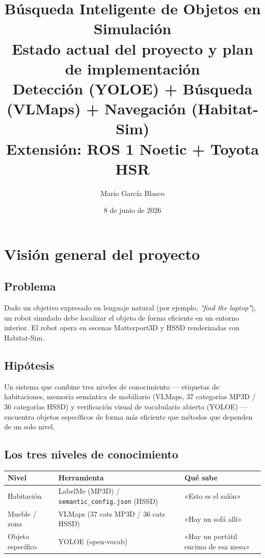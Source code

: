 \documentclass[11pt,a4paper]{article}
\title{\textbf{Búsqueda Inteligente de Objetos en Simulación}\\
\large Estado actual del proyecto y plan de implementación\\
\normalsize Detección (YOLOE) + Búsqueda (VLMaps) + Navegación (Habitat-Sim)\\
Extensión: ROS 1 Noetic + Toyota HSR}
\author{Mario García Blasco}
\date{8 de junio de 2026}
\begin{document}
\maketitle
\tableofcontents
\newpage

\section{Visión general del proyecto}

\subsection{Problema}

Dado un objetivo expresado en lenguaje natural (por ejemplo, \textit{"find the laptop"}), un robot
simulado debe localizar el objeto de forma eficiente en un entorno interior. El robot opera en
escenas Matterport3D y HSSD renderizadas con Habitat-Sim.

\subsection{Hipótesis}

Un sistema que combine tres niveles de conocimiento --- etiquetas de habitaciones, memoria
semántica de mobiliario (VLMaps, 37 categorías MP3D / 36 categorías HSSD) y verificación
visual de vocabulario abierto (YOLOE) --- encuentra objetos específicos de forma más eficiente
que métodos que dependen de un solo nivel.

\subsection{Los tres niveles de conocimiento}

\begin{center}
\begin{tabular}{lll}
\toprule
\textbf{Nivel} & \textbf{Herramienta} & \textbf{Qué sabe} \\
\midrule
Habitación & LabelMe (MP3D) / \texttt{semantic\_config.json} (HSSD) &
  «Esto es el salón» \\
Mueble / zona & VLMaps (37 cats MP3D / 36 cats HSSD) &
  «Hay un sofá allí» \\
Objeto específico & YOLOE (open-vocab) &
  «Hay un portátil encima de esa mesa» \\
\bottomrule
\end{tabular}
\end{center}
\end{document}
